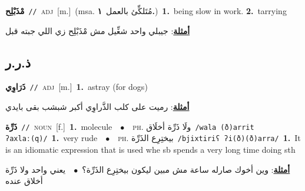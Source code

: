 \documentclass[10pt,a4paper,twoside]{article} %
\begin{document}
\begin{multicols}{2}
{{{\setlength\topsep{0pt}\textbf{\foreignlanguage{arabic}{مْذَبْلِح}}\ {\color{gray}\texttt{//}\color{black}}\ \textsc{adj}\ [m.]\ \color{gray}(msa. \foreignlanguage{arabic}{مُتَلكِّئ بالعمل}~\foreignlanguage{arabic}{\textbf{١.}})\color{black}\ \textbf{1.}~being slow in work.  \textbf{2.}~tarrying\  \begin{flushright}\color{gray}\foreignlanguage{arabic}{\textbf{\underline{\foreignlanguage{arabic}{أمثلة}}}: جيبلي واحد شغِّيل مش مْذَبْلِح زي اللي جبته قبل}\end{flushright}\color{black}} \vspace{2mm}

\vspace{-3mm}
\subsection*{\color{blue}\foreignlanguage{arabic}{ذ.ر.ر}\color{blue}{}} 

{\setlength\topsep{0pt}\textbf{\foreignlanguage{arabic}{ذَرَاوِي}}\ {\color{gray}\texttt{//}\color{black}}\ \textsc{adj}\ [m.]\ \textbf{1.}~astray (for dogs)\  \begin{flushright}\color{gray}\foreignlanguage{arabic}{\textbf{\underline{\foreignlanguage{arabic}{أمثلة}}}: رميت على كلب الذَّراوِي أكبر شبشب بقى بايدي}\end{flushright}\color{black}} \vspace{2mm}

{\setlength\topsep{0pt}\textbf{\foreignlanguage{arabic}{ذَرِّة}}\ {\color{gray}\texttt{//}\color{black}}\ \textsc{noun}\ [f.]\ \textbf{1.}~molecule\ \ $\bullet$\ \ \textsc{ph.} \color{gray} \foreignlanguage{arabic}{ولَا ذَرِّة أخلَاق}\color{black}\ {\color{gray}\texttt{/{\sffamily wala (ð)arrit ʔaxlaː(q)}/}\color{black}}\ \textbf{1.}~very rude\ \ $\bullet$\ \ \textsc{ph.} \color{gray} \foreignlanguage{arabic}{بيختِرِع الذَرِّة}\color{black}\ {\color{gray}\texttt{/{\sffamily bjixtiriʕ ʔi(ð)(ð)arra}/}\color{black}}\ \textbf{1.}~It is an idiomatic expression that is used whe sb spends a very long time doing sth\  \begin{flushright}\color{gray}\foreignlanguage{arabic}{\textbf{\underline{\foreignlanguage{arabic}{أمثلة}}}: وين أخوك صارله ساعة مش مبين ليكون بيختِرِع الذَرِّة؟\ $\bullet$\ \  يعني واحد ولا ذَرِّة أخلاق عنده}\end{flushright}\color{black}} \vspace{2mm}

}}
\end{multicols}
\end{document}
